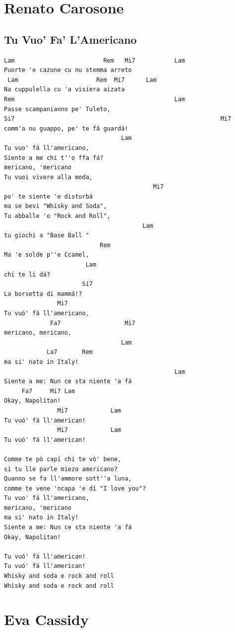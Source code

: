 \documentclass[a4paper]{article}
\begin{document}
\section{Renato Carosone} %
\label{sec:Renato Carosone}
\subsection{Tu Vuo' Fa' L'Americano} %
\label{sub:}
\begin{Verbatim}[commandchars=\\\{\}]
Lam                         Rem   Mi7           Lam
Puorte 'e cazune cu nu stemma arreto 
 Lam                      Rem  Mi7      Lam         
Na cuppulella cu 'a visiera aizata 
Rem                                             Lam
Passe scampanianno pe' Tuleto,
Si7                                                          Mi7                                          
comm'a nu guappo, pe' te fá guardá! 
                                 Lam
Tu vuo' fá ll'americano,
Siente a me chi t''o ffa fá?
mericano, 'mericano 
Tu vuoi vivere alla moda,
                                          Mi7
po' te siente 'e disturbá 
ma se bevi "Whisky and Soda",
Tu abballe 'o "Rock and Roll",
                                       Lam
tu giochi a "Base Ball "
                           Rem
Ma 'e solde p''e Ccamel,
                       Lam
chi te li dá?
                      Si7
La borsetta di mammá!?
               Mi7
Tu vuó' fá ll'americano,
             Fa7                  Mi7
mericano, mericano,
                                 Lam
            La7       Rem
ma si' nato in Italy!
                                                Lam
Siente a me: Nun ce sta niente 'a fá 
     Fa7     Mi7 Lam
Okay, Napolitan!
               Mi7            Lam
Tu vuó' fá ll'american!
               Mi7            Lam
Tu vuó' fá ll'american!

Comme te pò capí chi te vò' bene,
si tu lle parle miezo americano?
Quanno se fa ll'ammore sott''a luna,
comme te vene 'ncapa 'e dí "I love you"?
Tu vuo' fá ll'americano,
mericano, 'mericano 
ma si' nato in Italy!
Siente a me: Nun ce sta niente 'a fá 
Okay, Napolitan!

Tu vuó' fá ll'american!
Tu vuó' fá ll'american!
Whisky and soda e rock and roll
Whisky and soda e rock and roll
\end{Verbatim}
\newpage
\section{Eva Cassidy} %
\label{sec:Eva Cassidy}
\end{document}
